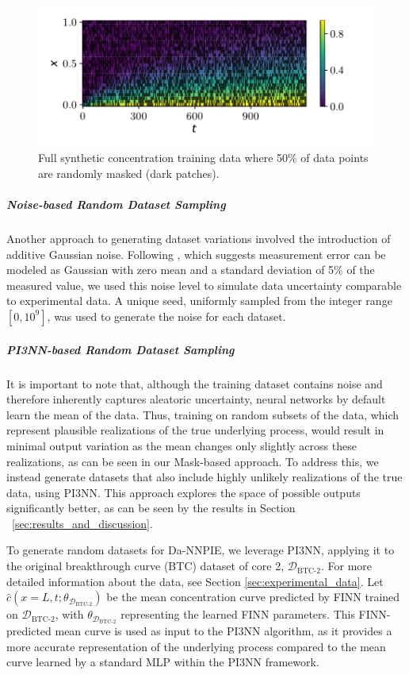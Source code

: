 \begin{figure}[h!]
    \centering
    \includegraphics{figs/c_diss_field_train_random_subset.pdf}
    \caption{Full synthetic concentration training data where 50\% of data points are randomly masked (dark patches).}
    \label{fig:training_data_mask}
\end{figure}


\subparagraph{Noise-based Random Dataset Sampling}

Another approach to generating dataset variations involved the introduction of additive Gaussian noise. Following \cite{nowak2016entropy}, which suggests measurement error can be modeled as Gaussian with zero mean and a standard deviation of 5\% of the measured value, we used this noise level to simulate data uncertainty comparable to experimental data. A unique seed, uniformly sampled from the integer range $[0, 10^9]$, was used to generate the noise for each dataset. %


\subparagraph{PI3NN-based Random Dataset Sampling}
\label{sec:random_dataset_sampling}
It is important to note that, although the training dataset contains noise and therefore inherently captures aleatoric uncertainty, neural networks by default learn the mean of the data. Thus, training on random subsets of the data, which represent plausible realizations of the true underlying process, would result in minimal output variation as the mean changes only slightly across these realizations, as can be seen in our Mask-based approach. To address this, we instead generate datasets that also include highly unlikely realizations of the true data, using PI3NN. This approach explores the space of possible outputs significantly better, as can be seen by the results in Section ~\vref{sec:results_and_discussion}.

To generate random datasets for Da-NNPIE, we leverage PI3NN, applying it to the original breakthrough curve (BTC) dataset of core 2, $\mathcal{D}_{\text{BTC-2}}$. For more detailed information about the data, see Section \vref{sec:experimental_data}.
Let $\hat{c}(x=L, t; \theta_{\mathcal{D}_{\text{BTC-2}}})$ be the mean concentration curve predicted by FINN trained on $\mathcal{D}_{\text{BTC-2}}$, with $\theta_{\mathcal{D}_{\text{BTC-2}}}$ representing the learned FINN parameters. This FINN-predicted mean curve is used as input to the PI3NN algorithm, as it provides a more accurate representation of the underlying process compared to the mean curve learned by a standard MLP within the PI3NN framework.

